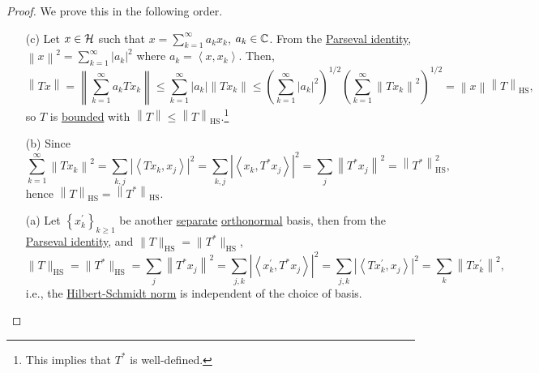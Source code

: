 \begin{proof}
	We prove this in the following order.
	\begin{enumerate}
		\item[(c)] Let \(x\in \mathcal{\MakeUppercase{h}} \) such that \(x = \sum_{k=1}^{\infty} a_{k} x_{k} \), \(a_{k} \in \mathbb{\MakeUppercase{c}} \). From the \hyperref[col:Parseval]{Parseval identity}, \(\left\lVert x\right\rVert ^{2} = \sum_{k=1}^{\infty}\left\vert a_{k}  \right\vert ^{2} \) where \(a_{k} = \left\langle x, x_{k}  \right\rangle \). Then,
			\[
				\left\lVert Tx\right\rVert
				= \left\lVert \sum_{k=1}^{\infty} a_{k} Tx_{k} \right\rVert
				\leq \sum_{k=1}^{\infty} \left\vert a_{k}  \right\vert \left\lVert T x_{k} \right\rVert
				\leq \left( \sum_{k=1}^{\infty} \left\vert a_{k} \right\vert ^2 \right) ^{1 / 2} \left( \sum_{k=1}^{\infty} \left\lVert T x_{k} \right\rVert ^{2} \right) ^{1 / 2}
				= \left\lVert x\right\rVert \left\lVert T\right\rVert _{\mathrm{HS}},
			\]
			so \(T\) is \hyperref[def:bounded-linear-op]{bounded} with \(\left\lVert T\right\rVert \leq \left\lVert T\right\rVert _{\mathrm{HS} }\).\footnote{This implies that \(T^{\ast} \) is well-defined.}
		\item[(b)] Since
			\[
				\sum_{k=1}^{\infty} \left\lVert Tx_{k} \right\rVert ^{2}
				= \sum_{k, j} \left\vert \left\langle  T x_{k} , x_{j} \right\rangle \right\vert ^{2}
				= \sum_{k, j} \left\vert \left\langle x_{k} , T^{\ast} x_{j}  \right\rangle  \right\vert ^{2}
				= \sum_{j} \left\lVert T^{\ast} x_{j} \right\rVert ^{2}
				= \left\lVert T^{\ast} \right\rVert ^{2} _{\mathrm{HS} },
			\]
			hence \(\left\lVert T\right\rVert _{\mathrm{HS} } = \left\lVert T^{\ast} \right\rVert _{\mathrm{HS} }\).
		\item[(a)] Let \(\left\{ x^\prime _k \right\}_{k\geq 1} \) be another \hyperref[def:separable]{separate} \hyperref[def:orthonormal-system]{orthonormal} basis, then from the \hyperref[col:Parseval]{Parseval identity}, and \(\lVert T \rVert _{\mathrm{HS} }= \lVert T^{\ast}  \rVert_{\mathrm{HS}}\),
			\[
				\lVert T \rVert _{\mathrm{HS} }
				= \lVert T^{\ast}  \rVert_{\mathrm{HS} }
				= \sum_{j} \left\lVert T^{\ast} x_{j} \right\rVert ^{2}
				= \sum_{j, k} \left\vert \left\langle x^\prime _{k} , T^{\ast} x_{j}  \right\rangle  \right\vert ^{2}
				= \sum_{j, k} \left\vert \left\langle T x^\prime _{k} , x_{j}  \right\rangle  \right\vert ^{2}
				= \sum_{k} \left\lVert T x^\prime _{k} \right\rVert ^{2},
			\]
			i.e., the \hyperref[def:Hilbert-Schmidt-norm]{Hilbert-Schmidt norm} is independent of the choice of basis.

\end{enumerate}
\end{proof}
